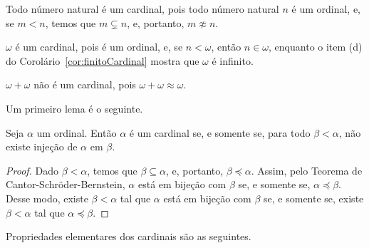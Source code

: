 \begin{example}
    Todo número natural é um cardinal, pois todo número natural $n$ é um ordinal, e, se $m<n$, temos que $m\subsetneq n$, e, portanto, $m\not\approx n$.
\end{example}
\begin{example}
    $\omega$ é um cardinal, pois é um ordinal, e, se $n<\omega$, então $n\in \omega$, enquanto o item (d) do Corolário~\ref{cor:finitoCardinal} mostra que $\omega$ é infinito.
\end{example}
\begin{example}
    $\omega+\omega$ não é um cardinal, pois $\omega+\omega\approx \omega$.
\end{example}

Um primeiro lema é o seguinte.

\begin{lemma}\label{lem:cardinalEquivNaoBijetaComOrdinalMenor}
    Seja $\alpha$ um ordinal.
    Então $\alpha$ é um cardinal se, e somente se, para todo $\beta<\alpha$, não existe injeção de $\alpha$ em $\beta$.
\end{lemma}
\begin{proof}
    Dado $\beta<\alpha$, temos que $\beta\subseteq \alpha$, e, portanto, $\beta\preceq \alpha$.
    Assim, pelo Teorema de Cantor-Schröder-Bernstein, $\alpha$ está em bijeção com $\beta$ se, e somente se, $\alpha\preceq \beta$.
    Desse modo, existe $\beta<\alpha$ tal que $\alpha$ está em bijeção com $\beta$ se, e somente se, existe $\beta<\alpha$ tal que $\alpha\preceq \beta$.
\end{proof}

Propriedades elementares dos cardinais são as seguintes.

